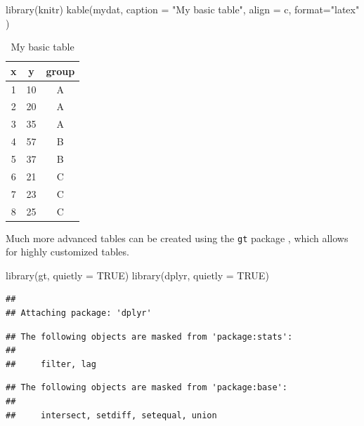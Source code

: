 \documentclass[
]{article}
\newenvironment{Shaded}{\begin{snugshade}}{\end{snugshade}}
\newcommand{\AttributeTok}[1]{\textcolor[rgb]{0.77,0.63,0.00}{#1}}
\newcommand{\ConstantTok}[1]{\textcolor[rgb]{0.00,0.00,0.00}{#1}}
\newcommand{\FunctionTok}[1]{\textcolor[rgb]{0.00,0.00,0.00}{#1}}
\newcommand{\NormalTok}[1]{#1}
\newcommand{\StringTok}[1]{\textcolor[rgb]{0.31,0.60,0.02}{#1}}
\begin{document}
\begin{Shaded}
\begin{Highlighting}[]
\FunctionTok{library}\NormalTok{(knitr)}
\FunctionTok{kable}\NormalTok{(mydat,}
      \AttributeTok{caption =} \StringTok{"My basic table"}\NormalTok{,}
      \AttributeTok{align =} \StringTok{\textquotesingle{}c\textquotesingle{}}\NormalTok{,  }
      \AttributeTok{format=}\StringTok{"latex"}\NormalTok{  )}
\end{Highlighting}
\end{Shaded}

\begin{table}

\caption{\label{tab:unnamed-chunk-46}My basic table}
\centering
\begin{tabular}[t]{c|c|c}
\hline
x & y & group\\
\hline
1 & 10 & A\\
\hline
2 & 20 & A\\
\hline
3 & 35 & A\\
\hline
4 & 57 & B\\
\hline
5 & 37 & B\\
\hline
6 & 21 & C\\
\hline
7 & 23 & C\\
\hline
8 & 25 & C\\
\hline
\end{tabular}
\end{table}

Much more advanced tables can be created using the \texttt{gt} package \citet{GT},
which allows for highly customized tables.

\begin{Shaded}
\begin{Highlighting}[]
\FunctionTok{library}\NormalTok{(gt, }
        \AttributeTok{quietly =} \ConstantTok{TRUE}\NormalTok{)}
\FunctionTok{library}\NormalTok{(dplyr,}
        \AttributeTok{quietly =} \ConstantTok{TRUE}\NormalTok{)}
\end{Highlighting}
\end{Shaded}

\begin{verbatim}
## 
## Attaching package: 'dplyr'
\end{verbatim}

\begin{verbatim}
## The following objects are masked from 'package:stats':
## 
##     filter, lag
\end{verbatim}

\begin{verbatim}
## The following objects are masked from 'package:base':
## 
##     intersect, setdiff, setequal, union
\end{verbatim}
\end{document}
